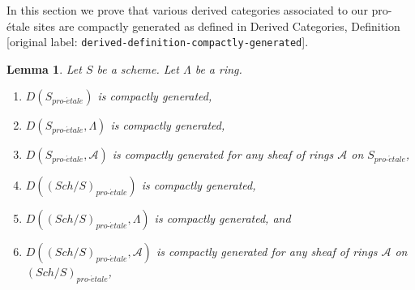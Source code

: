 \documentclass[10pt,a4paper]{article}
\theoremstyle{plain}
\newtheorem{lemma}[subsection]{Lemma}
\theoremstyle{definition}
\theoremstyle{remark}
\numberwithin{equation}{subsection}
\def\Sch{\mathit{Sch}}
\def\proetale{{pro\text{-}\acute{e}tale}}
\begin{document}
\noindent
In this section we prove that various derived categories associated
to our pro-\'etale sites are compactly generated as defined in
Derived Categories, Definition \textnormal{[original label: \nolinkurl{derived-definition-compactly-generated}]}.

\begin{lemma}
\label{lemma-enough-compact-proetale}
Let $S$ be a scheme. Let $\Lambda$ be a ring.
\begin{enumerate}
\item $D(S_\proetale)$ is compactly generated,
\item $D(S_\proetale, \Lambda)$ is compactly generated,
\item $D(S_\proetale, \mathcal{A})$ is compactly generated
for any sheaf of rings $\mathcal{A}$ on $S_\proetale$,
\item $D((\Sch/S)_\proetale)$ is compactly generated,
\item $D((\Sch/S)_\proetale, \Lambda)$ is compactly generated, and
\item $D((\Sch/S)_\proetale, \mathcal{A})$ is compactly generated
for any sheaf of rings $\mathcal{A}$ on $(\Sch/S)_\proetale$,
\end{enumerate}
\end{lemma}
\end{document}
